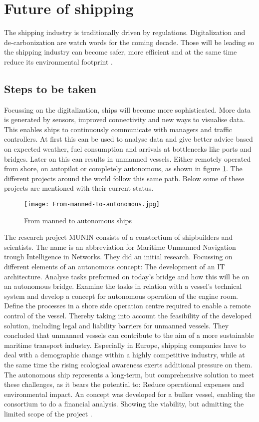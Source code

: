 \section{Future of shipping}
\label{sec:future}
The shipping industry is traditionally driven by regulations. Digitalization and de-carbonization are watch words for the coming decade. Those will be leading so the shipping industry can become safer, more efficient and at the same time reduce its environmental footprint \cite{Eriksen2017}. \\

\subsection{Steps to be taken}
Focussing on the digitalization, ships will become more sophisticated. More data is generated by sensors, improved connectivity and new ways to visualise data. This enables ships to continuously communicate with managers and traffic controllers. At first this can be used to analyse data and give better advice based on expected weather, fuel consumption and arrivals at bottlenecks like ports and bridges.
Later on this can results in unmanned vessels. Either remotely operated from shore, on autopilot or completely autonomous, as shown in figure \ref{fig:From-manned-to-autonomous}. The different projects around the world follow this same path. Below some of these projects are mentioned with their current status.

\begin{figure}[hb]
	\centering
	\texttt{[image: From-manned-to-autonomous.jpg]}
	\caption{From manned to autonomous ships}
	\label{fig:From-manned-to-autonomous}
\end{figure}

The research project MUNIN consists of a constortium of shipbuilders and scientists. The name is an abbreviation for Maritime Unmanned Navigation trough Intelligence in Networks. They did an initial research. Focussing on different elements of an autonomous concept: The development of an IT architecture. Analyse tasks preformed on today's bridge and how this will be on an autonomous bridge. Examine the tasks in relation with a vessel’s technical system and develop a concept for autonomous operation of the engine room. Define the processes in a shore side operation centre required to enable a remote control of the vessel. Thereby taking into account the feasibility of the developed solution, including legal and liability barriers for unmanned vessels.
They concluded that unmanned vessels can contribute to the aim of a more sustainable maritime transport industry. Especially in Europe, shipping companies have to deal with a demographic change within a highly competitive industry, while at the same time the rising ecological awareness exerts additional pressure on them. The autonomous ship represents a long-term, but comprehensive solution to meet these challenges, as it bears the potential to: Reduce operational expenses and
environmental impact.
An concept was developed for a bulker vessel, enabling the consortium to do a financial analysis. Showing the viability, but admitting the limited scope of the project \cite{MUNIN2016}.\\

